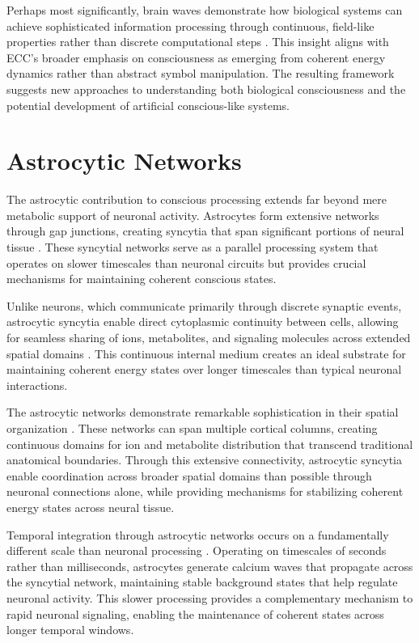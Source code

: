 \begin{refsection}
Perhaps most significantly, brain waves demonstrate how biological systems can achieve sophisticated information processing through continuous, field-like properties rather than discrete computational steps \cite{Singer2018}. This insight aligns with ECC's broader emphasis on consciousness as emerging from coherent energy dynamics rather than abstract symbol manipulation. The resulting framework suggests new approaches to understanding both biological consciousness and the potential development of artificial conscious-like systems.

\section{Astrocytic Networks}

The astrocytic contribution to conscious processing extends far beyond mere metabolic support of neuronal activity. Astrocytes form extensive networks through gap junctions, creating syncytia that span significant portions of neural tissue \cite{Giaume2010}. These syncytial networks serve as a parallel processing system that operates on slower timescales than neuronal circuits but provides crucial mechanisms for maintaining coherent conscious states.

Unlike neurons, which communicate primarily through discrete synaptic events, astrocytic syncytia enable direct cytoplasmic continuity between cells, allowing for seamless sharing of ions, metabolites, and signaling molecules across extended spatial domains \cite{Nagy2000}. This continuous internal medium creates an ideal substrate for maintaining coherent energy states over longer timescales than typical neuronal interactions.

The astrocytic networks demonstrate remarkable sophistication in their spatial organization \cite{Oberheim2012}. These networks can span multiple cortical columns, creating continuous domains for ion and metabolite distribution that transcend traditional anatomical boundaries. Through this extensive connectivity, astrocytic syncytia enable coordination across broader spatial domains than possible through neuronal connections alone, while providing mechanisms for stabilizing coherent energy states across neural tissue.

Temporal integration through astrocytic networks occurs on a fundamentally different scale than neuronal processing \cite{Bazargani2016}. Operating on timescales of seconds rather than milliseconds, astrocytes generate calcium waves that propagate across the syncytial network, maintaining stable background states that help regulate neuronal activity. This slower processing provides a complementary mechanism to rapid neuronal signaling, enabling the maintenance of coherent states across longer temporal windows.


\end{refsection}
